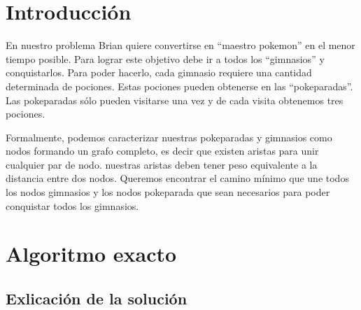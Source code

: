\documentclass[spanish,12pt]{article}
\begin{document}
\author{Grupo  \\Alvarez Vico Jazm\'in\\Cortés Conde Titó Javier María\\Pedraza Marcelo \\ Rozenberg Uriel Jonathan}


\maketitle


\clearpage

\tableofcontents
\cleardoublepage


\section{Introducción}
En nuestro problema Brian quiere convertirse en ``maestro pokemon'' en el menor tiempo posible. Para lograr este objetivo debe ir a todos los ``gimnasios'' y conquistarlos. Para poder hacerlo, cada gimnasio requiere una cantidad determinada de pociones. Estas pociones pueden obtenerse en las ``pokeparadas''. Las pokeparadas sólo pueden visitarse una vez y de cada visita obtenemos tres pociones.

Formalmente, podemos caracterizar nuestras pokeparadas y  gimnasios como nodos formando un grafo completo, es decir que existen aristas para unir cualquier par de nodo. nuestras aristas deben tener peso equivalente a la distancia entre dos nodos. Queremos encontrar el camino mínimo que une todos los nodos gimnasios y los nodos pokeparada que sean necesarios para poder conquistar todos los gimnasios. 


\section{Algoritmo exacto}

\subsection{Exlicación de la solución}
\end{document}
